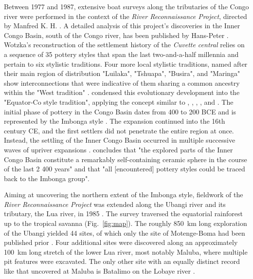 \documentclass[smallextended,natbib]{svjour3}       %
\begin{document}
Between 1977 and 1987, extensive boat surveys along the tributaries of the Congo river were performed in the context of the \textit{River Reconnaissance Project}, directed by Manfred K. H. \citet{Eggert.1983,Eggert.1984,Eggert.1993,Eggert.1996}. A detailed analysis of this project’s discoveries in the Inner Congo Basin, south of the Congo river, has been published by Hans-Peter \citet{Wotzka.1993}. Wotzka’s reconstruction of the settlement history of the \textit{Cuvette central} relies on a sequence of 35 pottery styles that span the last two-and-a-half millennia and pertain to six stylistic traditions. Four more local stylistic traditions, named after their main region of distribution "Luilaka", "Tshuapa", "Busira", and "Maringa" show interconnections that were indicative of them sharing a common ancestry within the "West tradition" \citep[219--225 Fig.~4]{Wotzka.1995}. \citet{Wotzka.1995} condensed this evolutionary development into the "Equator-Co style tradition", applying the concept similar to \citet{Rouse.1957}, \citet{Huffman.1970}, \citet{Schmidt.1975}, \citet{Vogel.1978}, and \citet{Hall.1983}. The initial phase of pottery in the Congo Basin dates from 400 to 200 BCE and is represented by the Imbonga style \citep[59--68]{Wotzka.1995}. The expansion continued into the 16th century CE, and the first settlers did not penetrate the entire region at once. Instead, the settling of the Inner Congo Basin occurred in multiple successive waves of upriver expansions \citep[226--241]{Wotzka.1995}. \citet[290]{Wotzka.1995} concludes that "the explored parts of the Inner Congo Basin constitute a remarkably self-containing ceramic sphere in the course of the last 2 400 years" and that "all [encountered] pottery styles could be traced back to the Imbonga group".

Aiming at uncovering the northern extent of the Imbonga style, fieldwork of the \textit{River Reconnaissance Project} was extended along the Ubangi river and its tributary, the Lua river, in 1985 \citep{Eggert.1987c}. The survey traversed the equatorial rainforest up to the tropical savanna (Fig.~\ref{fig:map}). The roughly 850~km long exploration of the Ubangi yielded 44 sites, of which only the site of Motenge-Boma had been published prior \citep[75]{vanNoten.1978,vanNoten.1982a}. Four additional sites were discovered along an approximately 100~km long stretch of the lower Lua river, most notably Maluba, where multiple pit features were excavated. The only other site with an equally distinct record like that uncovered at Maluba is Batalimo on the Lobaye river \citep{DeBayleDesHermens.1969,DeBayleDesHermens.1971,deBayledesHermens.1975}.
\end{document}
